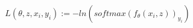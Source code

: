 \documentclass[preview]{standalone}
\begin{document}
\begin{align*}
L (\theta, z, x_i, y_i) := -ln(softmax(f_\theta(x_i, z))_{y_i})
\end{align*}
\end{document}
